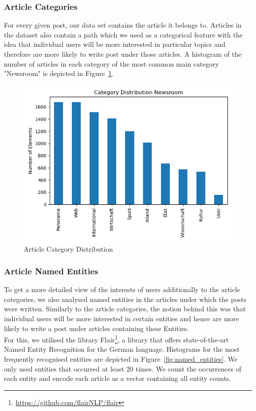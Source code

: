\documentclass[acmsmall]{acmart}
\begin{document}
\subsubsection{Article Categories}
For every given post, our data set contains the article it belongs to. Articles in the dataset also contain a path which we used as a categorical feature with the idea that individual users will be more interested in particular topics and therefore are more likely to write post under those articles. A histogram of the number of articles in each category of the most common main category "Newsroom" is depicted in Figure~\ref{fig:article_categories}.

\begin{figure}[H]
\includegraphics[width=.5\linewidth]{assets/Category_Distribution_Newsroom.png}
\caption{Article Category Distribution}
\label{fig:article_categories}
\end{figure}


\subsubsection{Article Named Entities}
To get a more detailed view of the interests of users additionally to the article categories, we also analysed named entities in the articles under which the posts were written. Similarly to the article categories, the notion behind this was that individual users will be more interested in certain entities and hence are more likely to write a post under articles containing these Entities. \\
For this, we utilised the library Flair\footnote{\url{https://github.com/flairNLP/flair}}, a library that offers state-of-the-art Named Entity Recognition for the German language. Histograms for the most frequently recognised entities are depicted in Figure~\ref{fig:named_entities}. We only used entities that occurred at least 20 times. We count the occurrences of each entity and encode each article as a vector containing all entity counts. 
\end{document}
